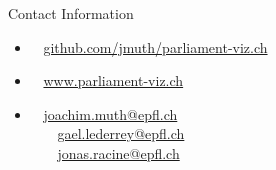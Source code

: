 \documentclass[final]{beamer}
\newlength{\onecolwid}
\begin{document}
\begin{frame}[t]
\begin{columns}[t]
\begin{column}{\onecolwid}
\begin{alertblock}{Contact Information}
\begin{itemize}
\item[] \faGithub ~ \href{https://github.com/jmuth/parliament-viz.ch}{github.com/jmuth/parliament-viz.ch}
\item[] \faGlobe ~ \href{http://parliament-viz.ch}{www.parliament-viz.ch}
\item[] \faAt ~ \href{mailto:joachim.muth@epfl.ch}{joachim.muth@epfl.ch} \\ ~ ~ \,\href{mailto:gael.lederrey@epfl.ch}{gael.lederrey@epfl.ch} \\ ~ ~ \,\href{mailto:jonas.racine@epfl.ch}{jonas.racine@epfl.ch}

\end{itemize}

\end{alertblock}



\end{column} %

\end{columns} %

\end{frame} %
\end{document}
